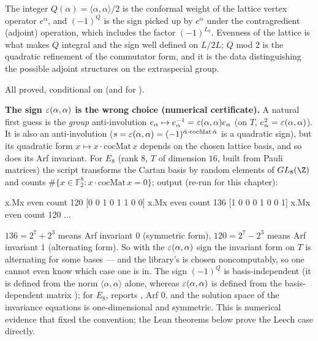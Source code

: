 \begin{physics}
The integer $Q(\alpha)=\langle\alpha,\alpha\rangle/2$ is the conformal weight of the lattice vertex operator $e^{\alpha}$, and $(-1)^{Q}$ is the sign picked up by $e^{\alpha}$ under the contragredient (adjoint) operation, which includes the factor $(-1)^{L_0}$. Evenness of the lattice is what makes $Q$ integral and the sign well defined on $L/2L$; $Q$ mod $2$ is the quadratic refinement of the commutator form, and it is the data distinguishing the possible adjoint structures on the extraspecial group.
\end{physics}
\begin{status}
All proved, conditional on  (and  for ).
\end{status}

\begin{warning}
\textbf{The sign $\varepsilon(\alpha,\alpha)$ is the wrong choice (numerical certificate).}  A natural
first guess is the \emph{group} anti-involution $e_\alpha\mapsto e_\alpha^{-1}=\varepsilon(\alpha,
\alpha)e_\alpha$ (on $T$, $e_\alpha^2=\varepsilon(\alpha,\alpha)$).  It is also an anti-involution
($s=\varepsilon(\alpha,\alpha)=(-1)^{\bar\alpha\cdot\mathrm{cocMat}\,\bar\alpha}$ is a quadratic sign),
but its quadratic form $x\mapsto x\cdot\mathrm{cocMat}\,x$ depends on the chosen lattice basis, and
so does its Arf invariant.  For $E_8$ (rank $8$, $T$ of dimension $16$, built from Pauli matrices)
the script  transforms the Cartan basis by random
elements of $GL_8(\Z)$ and counts $\#\{x\in\mathbb F_2^8: x\cdot\mathrm{cocMat}\,x=0\}$; output
(re-run for this chapter):
\begin{plaincode}
[0 0 1 1 1 1 1 0] x.Mx even count 120
[0 0 1 0 1 1 0 0] x.Mx even count 136
[1 0 0 0 1 0 0 1] x.Mx even count 120
...
\end{plaincode}
$136=2^7+2^3$ means Arf invariant $0$ (symmetric form), $120=2^7-2^3$ means Arf invariant $1$
(alternating form).  So with the $\varepsilon(\alpha,\alpha)$ sign the invariant form on $T$ is
alternating for some bases --- and the library's  is chosen noncomputably, so one
cannot even know which case one is in.  The sign $(-1)^Q$ is basis-independent (it is defined from the norm
$\langle\alpha,\alpha\rangle$ alone, whereas $\varepsilon(\alpha,\alpha)$ is defined from the
basis-dependent matrix ); for $E_8$,
 reports , Arf $0$, and the solution space of the
invariance equations is one-dimensional and symmetric.  This is numerical evidence that fixed the
convention; the Lean theorems below prove the Leech case directly.
\end{warning}

